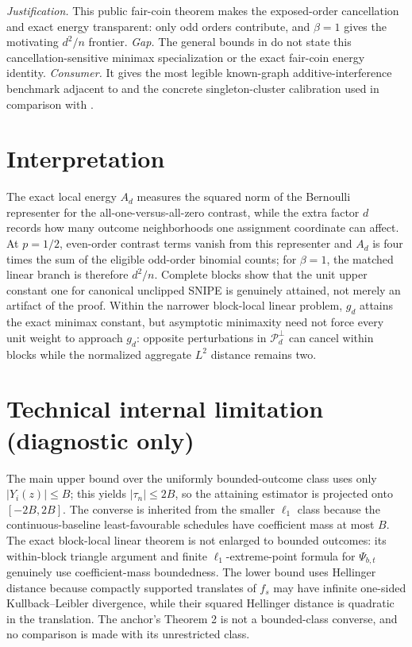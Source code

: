 \documentclass{article}
\begin{document}
\par\smallskip\noindent \textit{Justification.} This public fair-coin theorem makes the exposed-order cancellation and exact energy transparent: only odd orders contribute, and \(\beta=1\) gives the motivating \(d^2/n\) frontier. \textit{Gap.} The general bounds in \cite{CortezRodriguezEichhornYu2023} do not state this cancellation-sensitive minimax specialization or the exact fair-coin energy identity. \textit{Consumer.} It gives the most legible known-graph additive-interference benchmark adjacent to \cite{YuAiroldiBorgsChayes2022} and the concrete singleton-cluster calibration used in comparison with \cite{EichhornKhanUganderYu2026}.

\section{Interpretation}

The exact local energy \(A_d\) measures the squared norm of the Bernoulli representer for the all-one-versus-all-zero contrast, while the extra factor \(d\) records how many outcome neighborhoods one assignment coordinate can affect. At \(p=1/2\), even-order contrast terms vanish from this representer and \(A_d\) is four times the sum of the eligible odd-order binomial counts; for \(\beta=1\), the matched linear branch is therefore \(d^2/n\). Complete blocks show that the unit upper constant one for canonical unclipped SNIPE is genuinely attained, not merely an artifact of the proof. Within the narrower block-local linear problem, \(g_d\) attains the exact minimax constant, but asymptotic minimaxity need not force every unit weight to approach \(g_d\): opposite perturbations in \(\mathcal P_d^\perp\) can cancel within blocks while the normalized aggregate \(L^2\) distance remains two.

\section*{Technical internal limitation (diagnostic only)}

The main upper bound over the uniformly bounded-outcome class uses only \(|Y_i(z)|\le B\); this yields \(|\tau_n|\le2B\), so the attaining estimator is projected onto \([-2B,2B]\). The converse is inherited from the smaller \(\ell_1\) class because the continuous-baseline least-favourable schedules have coefficient mass at most \(B\). The exact block-local linear theorem is not enlarged to bounded outcomes: its within-block triangle argument and finite \(\ell_1\)-extreme-point formula for \(\Psi_{b,t}\) genuinely use coefficient-mass boundedness. The lower bound uses Hellinger distance because compactly supported translates of \(f_s\) may have infinite one-sided Kullback--Leibler divergence, while their squared Hellinger distance is quadratic in the translation. The anchor's Theorem 2 is not a bounded-class converse, and no comparison is made with its unrestricted class.
\end{document}

